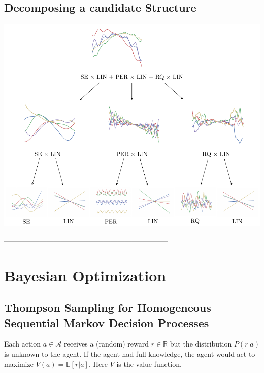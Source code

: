 \documentclass[a0,portrait]{a0poster}
\newcommand{\R}{\mathbb{R}}
\newcommand{\bkt}[1]{\left[ #1 \right]}
\newcommand{\Ebkt}[2][]{\mathbb{E}_{#1}\bkt{#2}}
\begin{document}
\begin{multicols}{2}
 \subsection*{Decomposing a candidate Structure}
\begin{center}\vspace{1cm}
\includegraphics[width=0.7\linewidth]{parseTree.pdf}
\end{center}\vspace{1cm}
 



---------------------------------------------------------------------

\section*{Bayesian Optimization}

\subsection*{Thompson Sampling for Homogeneous Sequential Markov Decision Processes}
Each action $a \in \mathcal{A}$ receives a (random) reward $r \in \R$ but the distribution $P(r|a)$ is unknown to the agent.  If the agent had full knowledge, the agent would act to maximize $V(a) = \Ebkt{r|a}$.  Here $V$ is the value function.


\end{multicols}
\end{document}
